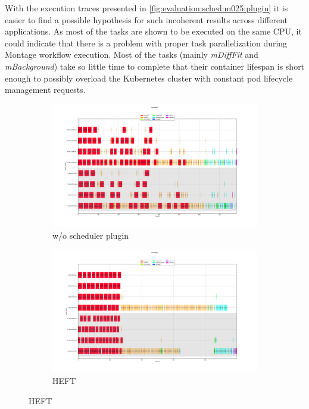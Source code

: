 With the execution traces presented in \cref{fig:evaluation:sched:m025:plugin} it is easier to find a possible hypothesis for such incoherent results across different applications.
As most of the tasks are shown to be executed on the same CPU, it could indicate that there is a problem with proper task parallelization during Montage workflow execution.
Most of the tasks (mainly \emph{mDiffFit} and \emph{mBackground}) take so little time to complete that their container lifespan is short enough to possibly overload the Kubernetes cluster with constant pod lifecycle management requests.
\begin{figure}[H]
    \begin{subfigure}{1\textwidth}
        \centering
        \includegraphics[width=0.75\linewidth]{figures/6-1-m0.25-empty.png}
        \caption[Selected example execution trace for Montage2-v0.25 workflow without static scheduling]{w/o scheduler plugin}
        \label{fig:evaluation:sched:m025:em}
    \end{subfigure}
    \begin{subfigure}{1\textwidth}
        \centering
        \includegraphics[width=0.75\linewidth]{figures/6-1-m0.25-heft.png}
        \caption[Selected example execution traces for Montage2-v0.25 workflow with HEFT]{HEFT}
        \label{fig:evaluation:sched:m025:heft}
    \end{subfigure}

\end{figure}
